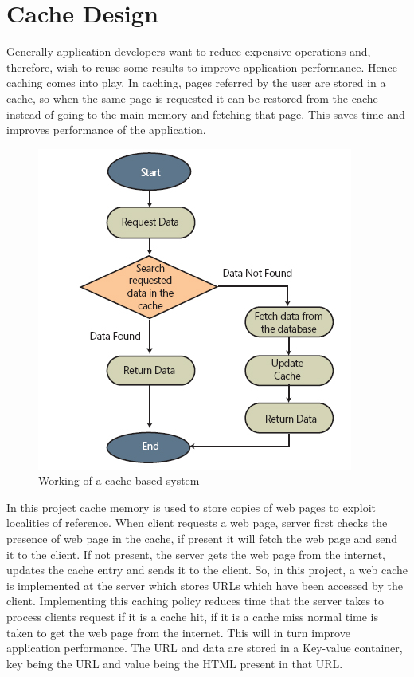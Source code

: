 \documentclass[11pt,pdftex,twocolumn]{article}
\begin{document}
\section{Cache Design}
\label{sec:cacheDesign}
Generally application developers want to reduce expensive operations and, therefore, wish to reuse some results to improve application performance. Hence caching comes into play. In caching, pages referred by the user are stored in a cache, so when the same page is requested it can be restored from the cache instead of going to the main memory and fetching that page. This saves time and improves performance of the application. 
\begin{figure}[!h]
\centering
\includegraphics[scale=0.6]{images/cache.PNG}
\caption{Working of a cache based system}
\label{img:cache}
\end{figure}
In this project cache memory is used to store copies of web pages to exploit localities of reference. When client requests a web page, server first checks the presence of web page in the cache, if present it will fetch the web page and send it to the client. If not present, the server gets the web page from the internet, updates the cache entry and sends it to the client. So, in this project, a web cache is implemented at the server which stores URLs which have been accessed by the client. Implementing this caching policy reduces time that the server takes to process clients request if it is a cache hit, if it is a cache miss normal time is taken to get the web page from the internet. This will in turn improve application performance. The URL and data are stored in a Key-value container, key being the URL and value being the HTML present in that URL.
\end{document}
